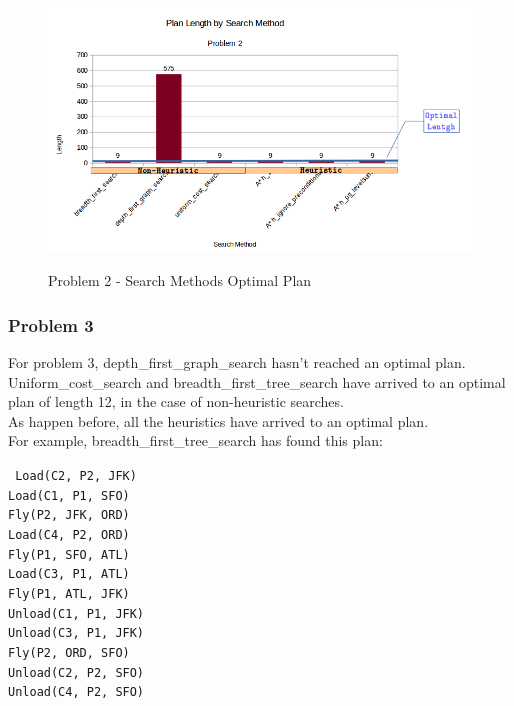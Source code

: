 \documentclass[10pt, a4paper,english]{article}
\begin{document}
\begin{figure}[h]
\begin{center}
\includegraphics[width=1\textwidth]{problem2.png}\\
\caption{Problem 2 - Search Methods Optimal Plan}
\end{center}
\end{figure}

\subsubsection{Problem 3}

For problem 3, depth\_first\_graph\_search hasn't reached an optimal plan. \\

Uniform\_cost\_search and breadth\_first\_tree\_search have arrived to an optimal plan of length 12, in the case of non-heuristic searches. \\

As happen before, all the heuristics have arrived to an optimal plan. \\

For example, breadth\_first\_tree\_search  has found this plan:

\indent \texttt{ 
\indent Load(C2, P2, JFK)\\
\indent Load(C1, P1, SFO)\\
\indent Fly(P2, JFK, ORD)\\
\indent Load(C4, P2, ORD)\\
\indent Fly(P1, SFO, ATL)\\
\indent Load(C3, P1, ATL)\\
\indent Fly(P1, ATL, JFK)\\
\indent Unload(C1, P1, JFK)\\
\indent Unload(C3, P1, JFK)\\
\indent Fly(P2, ORD, SFO)\\
\indent Unload(C2, P2, SFO)\\
\indent Unload(C4, P2, SFO)\\
}
\end{document}
